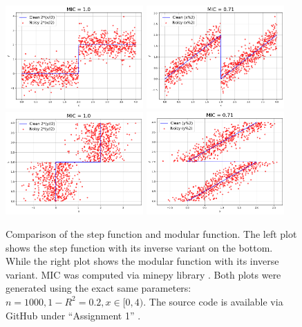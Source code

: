 \documentclass{article}
\begin{document}
\begin{figure}
    \centering
    \includegraphics[width=0.47\textwidth]{images/step1.png}
    \includegraphics[width=0.47\textwidth]{images/mod1.png}
    \includegraphics[width=0.47\textwidth]{images/step2.png}
    \includegraphics[width=0.47\textwidth]{images/mod2.png}
    \caption{Comparison of the step function and modular function. The left plot shows the step function with its inverse variant on the bottom. While the right plot shows the modular function with its inverse variant. MIC was computed via minepy library \citep{minepy}. Both plots were generated using the exact same parameters: $n = 1000, 1-R^2=0.2, x\in [0, 4)$. The source code is available via GitHub under ``Assignment 1'' \citep{src}.}
    \label{fig:step_mod}
\end{figure}
\end{document}
